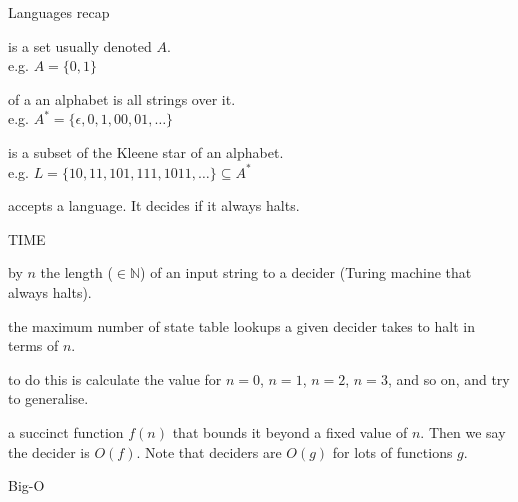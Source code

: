 \begin{frame}{Languages recap}
  
  \begin{description}
    \setlength\itemsep{5mm}
    \item[Alphabet] is a set usually denoted \( A \). \\ e.g. \( A = \{ 0 , 1 \} \)
    \item[Kleene star] of a an alphabet is all strings over it. \\ e.g. \( A^* = \{ \epsilon, 0, 1, 00, 01, \ldots \} \)
    \item[Language] is a subset of the Kleene star of an alphabet. \\  e.g. \( L = \{ 10, 11, 101, 111, 1011, \ldots \} \subseteq A^* \)
    \item[Turing machine] accepts a language. It decides if it always halts.
  \end{description}

\end{frame}

\begin{frame}{TIME}
  

  \begin{description}
    \setlength\itemsep{2mm}
    \item[Denote] by \(n\) the length (\(\in \mathbb{N}\)) of an input string to a decider (Turing machine that always halts).
    \item[Calculate] the maximum number of state table lookups a given decider takes to halt in terms of \(n\).
    \item[One way] to do this is calculate the value for \(n=0\), \(n=1\), \(n=2\), \(n=3\), and so on, and try to generalise.
    \item[Find] a succinct function \(f(n)\) that bounds it beyond a fixed value of \(n\). Then we say the decider is \(O(f)\). Note that deciders are \(O(g)\) for lots of functions \(g\).
  \end{description}

\end{frame}


\begin{frame}[fragile]{Big-O}
  \begin{center}
  \end{center}
\end{frame}


